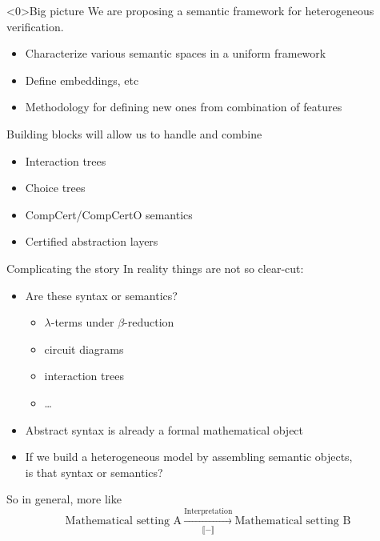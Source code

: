 \documentclass[aspectratio=1610,mathserif]{beamer}
\begin{document}
\begin{frame}<0>{Big picture} %
We are proposing a semantic framework
for heterogeneous verification.
\begin{itemize}
  \item Characterize various semantic spaces in a uniform framework
  \item Define embeddings, etc
  \item Methodology for defining new ones from combination of features
\end{itemize}

\vspace{1em}
Building blocks will allow us to handle and combine
\begin{itemize}
  \item Interaction trees
  \item Choice trees
  \item CompCert/CompCertO semantics
  \item Certified abstraction layers
\end{itemize}
\end{frame}

\begin{frame}{Complicating the story} %
  In reality things are not so clear-cut:
  \begin{itemize}
    \item Are these syntax or semantics?
      \begin{itemize}
        \item $\lambda$-terms under $\beta$-reduction
        \item circuit diagrams
        \item interaction trees
        \item \ldots
      \end{itemize}
    \pause
    \item Abstract syntax is already
      a formal mathematical object
    \pause
    \item If we build a heterogeneous model
      by assembling semantic objects, \\
      is that syntax or semantics?
  \end{itemize}

  \pause
  \vspace{1em}
  So in general, more like
  \[
    \text{Mathematical setting A} \:
    \xrightarrow[\llbracket - \rrbracket]{\text{Interpretation}} \:
    \text{Mathematical setting B}
  \]
\end{frame}
\end{document}

